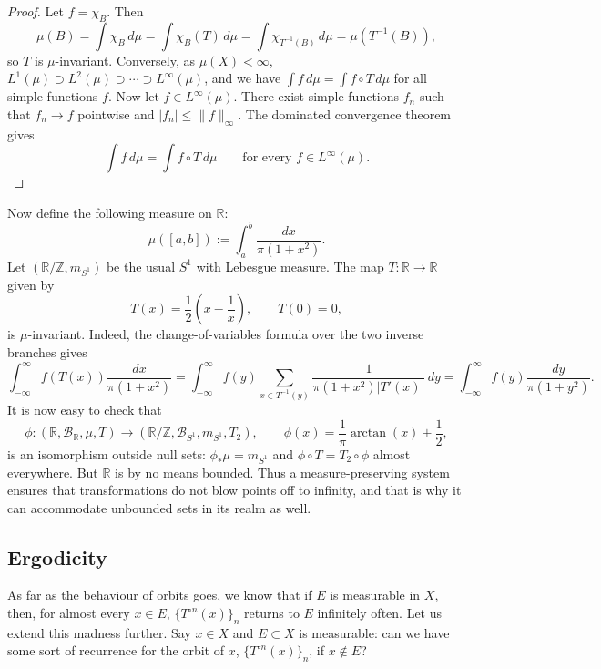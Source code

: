 \documentclass[11pt,a4paper]{article}
\begin{document}
\begin{proof}
Let $f=\chi_B$. Then
\[
  \mu(B)=\int\chi_B\,d\mu=\int\chi_B(T)\,d\mu
  =\int\chi_{T^{-1}(B)}\,d\mu=\mu(T^{-1}(B)),
\]
so $T$ is $\mu$-invariant. Conversely, as $\mu(X)<\infty$,
$L^1(\mu)\supset L^2(\mu)\supset\cdots\supset L^\infty(\mu)$, and we have
$\int f\,d\mu=\int f\circ T\,d\mu$ for all simple functions $f$.
Now let $f\in L^\infty(\mu)$. There exist simple functions $f_n$ such that
$f_n\to f$ pointwise and $|f_n|\leq\|f\|_\infty$. The dominated convergence theorem gives
\[
  \int f\,d\mu=\int f\circ T\,d\mu
  \qquad\text{for every }f\in L^\infty(\mu).
\]
\end{proof}

Now define the following measure on $\mathbb R$:
\[
  \mu([a,b]):=\int_a^b\frac{dx}{\pi(1+x^2)}.
\]
Let $(\mathbb R/\mathbb Z,m_{S^1})$ be the usual $S^1$ with Lebesgue measure.
The map $T\colon\mathbb R\to\mathbb R$ given by
\[
  T(x)=\frac12\left(x-\frac1x\right),\qquad T(0)=0,
\]
is $\mu$-invariant. Indeed, the change-of-variables formula over the two inverse branches gives
\[
  \int_{-\infty}^{\infty}f(T(x))\frac{dx}{\pi(1+x^2)}
  =\int_{-\infty}^{\infty}f(y)
  \sum_{x\in T^{-1}(y)}\frac{1}{\pi(1+x^2)|T'(x)|}\,dy
  =\int_{-\infty}^{\infty}f(y)\frac{dy}{\pi(1+y^2)}.
\]
It is now easy to check that
\[
  \phi\colon(\mathbb R,\mathcal B_{\mathbb R},\mu,T)
  \longrightarrow(\mathbb R/\mathbb Z,\mathcal B_{S^1},m_{S^1},T_2),
  \qquad \phi(x)=\frac1\pi\arctan(x)+\frac12,
\]
is an isomorphism outside null sets: $\phi_*\mu=m_{S^1}$ and $\phi\circ T=T_2\circ\phi$ almost everywhere.
But $\mathbb R$ is by no means bounded. Thus a measure-preserving system
ensures that transformations do not blow points off to infinity, and that is
why it can accommodate unbounded sets in its realm as well.

\subsection{Ergodicity}
As far as the behaviour of orbits goes, we know that if $E$ is measurable in
$X$, then, for almost every $x\in E$, $\{T^{\circ n}(x)\}_n$ returns to $E$
infinitely often. Let us extend this madness further. Say $x\in X$ and
$E\subset X$ is measurable: can we have some sort of recurrence for the orbit
of $x$, $\{T^{\circ n}(x)\}_n$, if $x\notin E$?
\end{document}
